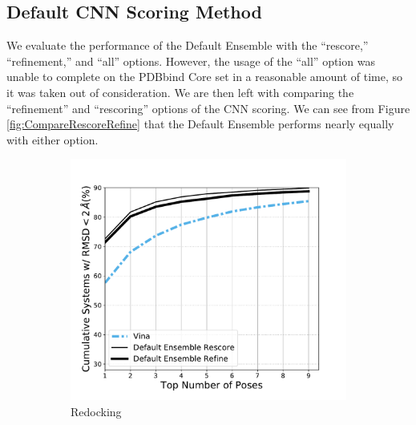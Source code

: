\documentclass[journal=jcisd8,manuscript=article]{achemso}
\begin{document}
\subsection{Default CNN Scoring Method}
 We evaluate the performance of the Default Ensemble with the ``rescore,'' ``refinement,'' and ``all'' options. However, the usage of the ``all'' option was unable to complete on the PDBbind Core set in a reasonable amount of time, so it was taken out of consideration. We are then left with comparing the ``refinement'' and ``rescoring'' options of the CNN scoring. We can see from Figure \ref{fig:CompareRescoreRefine} that the Default Ensemble performs nearly equally with either option.

\begin{figure}    
        \begin{subfigure}[b]{0.48\textwidth}    
		\centering
		\includegraphics[width=\textwidth]{figures/redocking/rescore_vs_refine_line.pdf} 
		\caption{Redocking}
		\label{fig:CompareRescoreRefineRedock}
        \end{subfigure}    
        \begin{subfigure}[b]{0.48\textwidth}    
		\centering

\end{subfigure}
\end{figure}
\end{document}
